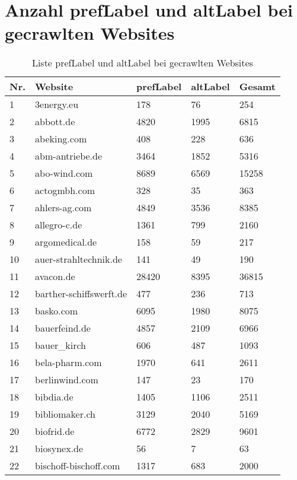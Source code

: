%
\section{Anzahl prefLabel und altLabel bei gecrawlten Websites}\label{sec:listelabel}
\begin{longtable}{|m{0.5cm}|m{6cm}|m{2cm}|m{2cm}|m{2cm}|}
	\caption{Liste prefLabel und altLabel bei gecrawlten Websites}\label{tbl:label}\\%
	\hline
	\textbf{Nr.} & \textbf{Website} & \textbf{prefLabel} & \textbf{altLabel} & \textbf{Gesamt} \\
	\hline \hline
	1 & 3energy.eu & 178 & 76 & 254\\
	\hline
	2 & abbott.de & 4820 & 1995 & 6815\\
	\hline
	3 & abeking.com & 408 & 228 & 636\\
	\hline
	4 & abm-antriebe.de & 3464 & 1852 & 5316\\
	\hline
	5 & abo-wind.com & 8689 & 6569 & 15258\\
	\hline
	6 & actogmbh.com & 328 & 35 & 363\\
	\hline
	7 & ahlers-ag.com & 4849 & 3536 & 8385\\
	\hline
	8 & allegro-c.de & 1361 & 799 & 2160\\
	\hline
	9 & argomedical.de & 158 & 59 & 217\\
	\hline
	10 & auer-strahltechnik.de & 141 & 49 & 190\\
	\hline
	11 & avacon.de & 28420 & 8395 & 36815\\
	\hline
	12 & barther-schiffswerft.de & 477 & 236 & 713\\
	\hline
	13 & basko.com & 6095 & 1980 & 8075\\
	\hline
	14 & bauerfeind.de & 4857 & 2109 & 6966\\
	\hline
	15 & bauer\_kirch & 606 & 487 & 1093\\
	\hline
	16 & bela-pharm.com & 1970 & 641 & 2611\\
	\hline
	17 & berlinwind.com & 147 & 23 & 170\\
	\hline
	18 & bibdia.de & 1405 & 1106 & 2511\\
	\hline
	19 & bibliomaker.ch & 3129 & 2040 & 5169\\
	\hline
	20 & biofrid.de & 6772 & 2829 & 9601\\
	\hline
	21 & biosynex.de & 56 & 7 & 63\\
	\hline
	22 & bischoff-bischoff.com & 1317 & 683 & 2000\\

\end{longtable}
